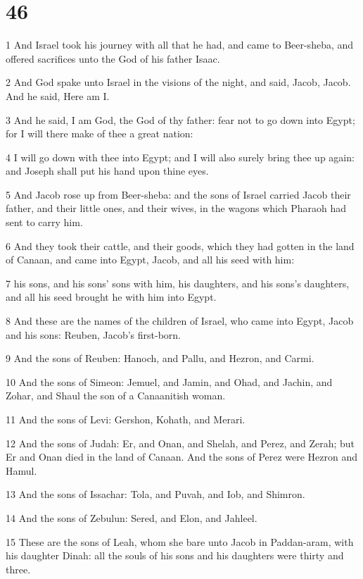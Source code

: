 \chapter{46}

\par 1 And Israel took his journey with all that he had, and came to Beer-sheba, and offered sacrifices unto the God of his father Isaac.
\par 2 And God spake unto Israel in the visions of the night, and said, Jacob, Jacob. And he said, Here am I.
\par 3 And he said, I am God, the God of thy father: fear not to go down into Egypt; for I will there make of thee a great nation:
\par 4 I will go down with thee into Egypt; and I will also surely bring thee up again: and Joseph shall put his hand upon thine eyes.
\par 5 And Jacob rose up from Beer-sheba: and the sons of Israel carried Jacob their father, and their little ones, and their wives, in the wagons which Pharaoh had sent to carry him.
\par 6 And they took their cattle, and their goods, which they had gotten in the land of Canaan, and came into Egypt, Jacob, and all his seed with him:
\par 7 his sons, and his sons' sons with him, his daughters, and his sons's daughters, and all his seed brought he with him into Egypt.
\par 8 And these are the names of the children of Israel, who came into Egypt, Jacob and his sons: Reuben, Jacob's first-born.
\par 9 And the sons of Reuben: Hanoch, and Pallu, and Hezron, and Carmi.
\par 10 And the sons of Simeon: Jemuel, and Jamin, and Ohad, and Jachin, and Zohar, and Shaul the son of a Canaanitish woman.
\par 11 And the sons of Levi: Gershon, Kohath, and Merari.
\par 12 And the sons of Judah: Er, and Onan, and Shelah, and Perez, and Zerah; but Er and Onan died in the land of Canaan. And the sons of Perez were Hezron and Hamul.
\par 13 And the sons of Issachar: Tola, and Puvah, and Iob, and Shimron.
\par 14 And the sons of Zebulun: Sered, and Elon, and Jahleel.
\par 15 These are the sons of Leah, whom she bare unto Jacob in Paddan-aram, with his daughter Dinah: all the souls of his sons and his daughters were thirty and three.
